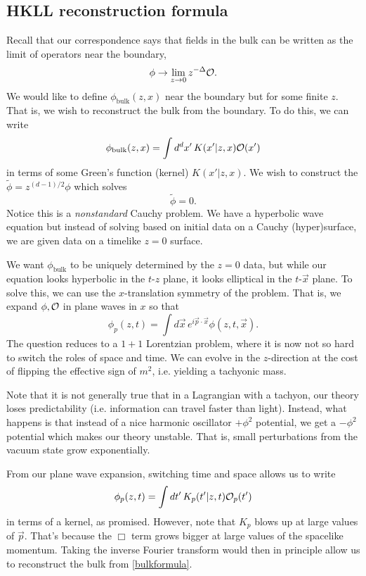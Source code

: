 \subsection*{HKLL reconstruction formula}
Recall that our correspondence says that fields in the bulk can be written as the limit of operators near the boundary,
\begin{equation}
    \phi \to \lim_{z\to 0} z^{-\Delta} \mathcal O.
\end{equation}
We would like to define $\phi_\text{bulk}(z,x)$ near the boundary but for some finite $z$. That is, we wish to reconstruct the bulk from the boundary.
To do this, we can write
\begin{equation}\label{bulkformula}
    \phi_\text{bulk}(z,x)=\int d^d x' \, K(x'|z,x)\mathcal O(x')
\end{equation}
in terms of some Green's function (kernel) $K(x'|z,x)$. We wish to construct the $\tilde \phi = z^{(d-1)/2}\phi$ which solves
\begin{equation}
    [\p_z^2 -\frac{\tilde m^2}{z^2} + \Box^{(d)}]\tilde \phi =0.
\end{equation}
Notice this is a \emph{nonstandard} Cauchy problem. We have a hyperbolic wave equation but instead of solving based on initial data on a Cauchy (hyper)surface, we are given data on a timelike $z=0$ surface. 

We want $\phi_\text{bulk}$ to be uniquely determined by the $z=0$ data, but while our equation looks hyperbolic in the $t$-$z$ plane, it looks elliptical in the $t$-$\vec{x}$ plane. To solve this, we can use the $x$-translation symmetry of the problem. That is, we expand $\phi,\mathcal O$ in plane waves in $x$ so that
\begin{equation}
    \phi_p(z,t)= \int d\vec x \, e^{i\vec p \cdot \vec x}\phi(z,t,\vec{x}).
\end{equation}
The question reduces to a $1+1$ Lorentzian problem, where it is now not so hard to switch the roles of space and time. We can evolve in the $z$-direction at the cost of flipping the effective sign of $m^2$, i.e. yielding a tachyonic mass.

Note that it is not generally true that in a Lagrangian with a tachyon, our theory loses predictability (i.e. information can travel faster than light). Instead, what happens is that instead of a nice harmonic oscillator $+\phi^2$ potential, we get a $-\phi^2$ potential which makes our theory unstable. That is, small perturbations from the vacuum state grow exponentially.

From our plane wave expansion, switching time and space allows us to write
\begin{equation}
    \phi_p(z,t)=\int dt' \, K_p(t'|z,t) \mathcal O_p(t')
\end{equation}
in terms of a kernel, as promised. However, note that $K_p$ blows up at large values of $\vec{p}$. That's because the $\Box$ term grows bigger at large values of the spacelike momentum. Taking the inverse Fourier transform would then in principle allow us to reconstruct the bulk from \ref{bulkformula}.

